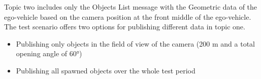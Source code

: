 Topic two includes only the Objects List message with the Geometric data of the ego-vehicle based on the camera position at the front middle of the ego-vehicle.
The test scenario offers two options for publishing different data in topic one.
\begin{itemize}
	\item Publishing only objects in the field of view of the camera (200 m and a total opening angle of \ang{60})
	\item Publishing all spawned objects over the whole test period
\end{itemize}